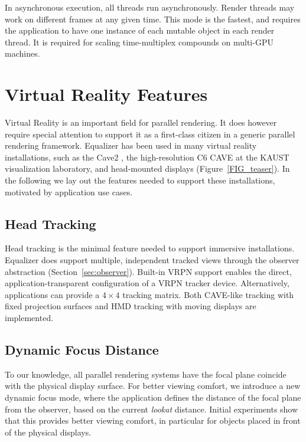 \documentclass[10pt,journal,compsoc]{IEEEtran}
\newcommand{\sref}[1]{Section~\ref{#1}}
\newcommand{\fig}[1]{Figure~\ref{#1}}
\begin{document}
In asynchronous execution, all threads run asynchronously. Render threads may
work on different frames at any given time. This mode is the fastest, and
requires the application to have one instance of each mutable object in each
render thread. It is required for scaling time-multiplex compounds on multi-GPU
machines.

\section{Virtual Reality Features}

Virtual Reality is an important field for parallel rendering. It does however
require special attention to support it as a first-class citizen in a generic
parallel rendering framework. \textsf{Equalizer} has been used in many virtual
reality installations, such as the Cave2 \cite{FNTTL:13}, the high-resolution C6
CAVE at the KAUST visualization laboratory, and head-mounted displays
(\fig{FIG_teaser}). In the following we lay out the features needed to support
these installations, motivated by application use cases.

\subsection{Head Tracking}

Head tracking is the minimal feature needed to support immersive installations.
\textsf{Equalizer} does support multiple, independent tracked views through the
observer abstraction (\sref{sec:observer}). Built-in VRPN support enables the
direct, application-transparent configuration of a VRPN tracker device.
Alternatively, applications can provide a $4\times 4$ tracking matrix. Both
CAVE-like tracking with fixed projection surfaces and HMD tracking with moving
displays are implemented.

\subsection{Dynamic Focus Distance}

To our knowledge, all parallel rendering systems have the focal plane coincide
with the physical display surface. For better viewing comfort, we introduce a
new dynamic focus mode, where the application defines the distance of the focal
plane from the observer, based on the current \textit{lookat} distance. Initial
experiments show that this provides better viewing comfort, in particular for
objects placed in front of the physical displays.
\end{document}
